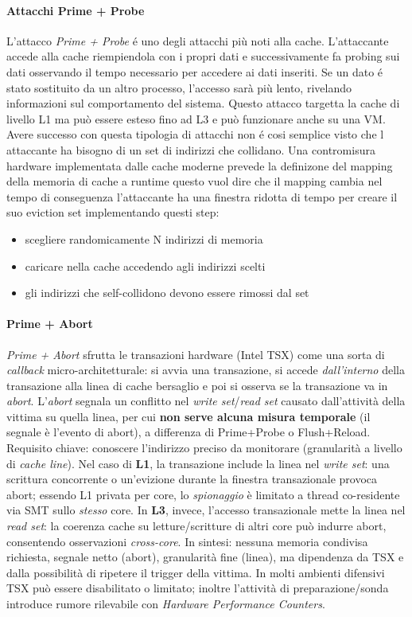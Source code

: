 \paragraph{Attacchi Prime + Probe}
L'attacco \emph{Prime + Probe} \'e uno degli attacchi più noti alla cache. L'attaccante accede alla cache riempiendola con i propri dati e successivamente fa probing sui dati osservando il tempo necessario per accedere ai dati inseriti. Se un dato \'e stato sostituito da un altro processo, l'accesso sarà più lento, rivelando informazioni sul comportamento del sistema. Questo attacco targetta la cache di livello L1  ma può essere esteso fino ad L3 e può funzionare anche su una VM. Avere successo con questa tipologia di attacchi non \'e cosi semplice visto che l attaccante ha bisogno di un set di indirizzi che collidano.
Una contromisura hardware implementata dalle cache moderne prevede la definizone del mapping della memoria di cache a runtime questo vuol dire che il mapping cambia nel tempo di conseguenza l'attaccante ha una finestra ridotta di tempo per creare il suo eviction set implementando questi step:
\begin{itemize}
    \item scegliere randomicamente N indirizzi di memoria
    \item caricare nella cache accedendo agli indirizzi scelti
    \item gli indirizzi che self-collidono devono essere rimossi dal set
\end{itemize}

\paragraph{Prime + Abort}
\emph{Prime + Abort} sfrutta le transazioni hardware (Intel TSX) come una sorta di \emph{callback} micro-architetturale: si avvia una transazione, si accede \emph{dall’interno} della transazione alla linea di cache bersaglio e poi si osserva se la transazione va in \emph{abort}. L’\emph{abort} segnala un conflitto nel \emph{write set}/\emph{read set} causato dall’attività della vittima su quella linea, per cui \textbf{non serve alcuna misura temporale} (il segnale è l’evento di abort), a differenza di Prime+Probe o Flush+Reload. Requisito chiave: conoscere l’indirizzo preciso da monitorare (granularità a livello di \emph{cache line}).
Nel caso di \textbf{L1}, la transazione include la linea nel \emph{write set}: una scrittura concorrente o un’evizione durante la finestra transazionale provoca abort; essendo L1 privata per core, lo \emph{spionaggio} è limitato a thread co-residente via SMT sullo \emph{stesso} core. In \textbf{L3}, invece, l’accesso transazionale mette la linea nel \emph{read set}: la coerenza cache su letture/scritture di altri core può indurre abort, consentendo osservazioni \emph{cross-core}. In sintesi: nessuna memoria condivisa richiesta, segnale netto (abort), granularità fine (linea), ma dipendenza da TSX e dalla possibilità di ripetere il trigger della vittima. In molti ambienti difensivi TSX può essere disabilitato o limitato; inoltre l’attività di preparazione/sonda introduce rumore rilevabile con \emph{Hardware Performance Counters}.

